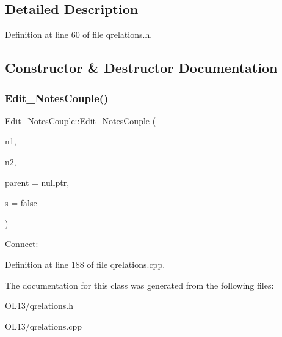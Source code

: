 \subsection{Detailed Description}


Definition at line 60 of file qrelations.\+h.



\subsection{Constructor \& Destructor Documentation}
\mbox{\label{class_edit___notes_couple_aa0780f3a53175747c5a7136d4f2ffa30}} 
\subsubsection{\texorpdfstring{Edit\+\_\+\+Notes\+Couple()}{Edit\_NotesCouple()}}
{\footnotesize\ttfamily Edit\+\_\+\+Notes\+Couple\+::\+Edit\+\_\+\+Notes\+Couple (\begin{DoxyParamCaption}\item[{\hyperlink{class_note}{Note} $\ast$}]{n1,  }\item[{\hyperlink{class_note}{Note} $\ast$}]{n2,  }\item[{Q\+Widget $\ast$}]{parent = {\ttfamily nullptr},  }\item[{bool}]{s = {\ttfamily false} }\end{DoxyParamCaption})}

Connect\+: 

Definition at line 188 of file qrelations.\+cpp.



The documentation for this class was generated from the following files\+:\begin{DoxyCompactItemize}
\item 
O\+L13/qrelations.\+h\item 
O\+L13/qrelations.\+cpp\end{DoxyCompactItemize}
